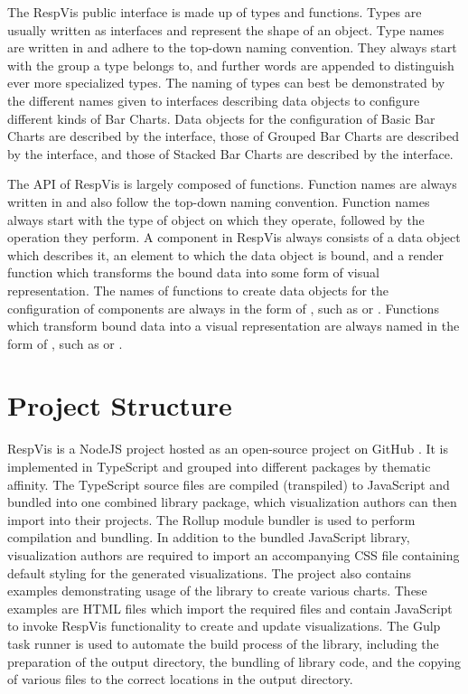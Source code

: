 The RespVis public interface is made up of types and functions. Types
are usually written as interfaces and represent the shape of an
object. Type names are written in 
\parencite{PascalCase} and adhere to the top-down naming
convention. They always start with the group a type belongs to, and
further words are appended to distinguish ever more specialized
types. The naming of types can best be demonstrated by the different
names given to interfaces describing data objects to configure
different kinds of Bar Charts. Data objects for the configuration of
Basic Bar Charts are described by the  interface, those
of Grouped Bar Charts are described by the 
interface, and those of Stacked Bar Charts are described by the
 interface.

The API of RespVis is largely composed of functions. Function names
are always written in  \parencite{camelCase} and also
follow the top-down naming convention. Function names always start
with the type of object on which they operate, followed by the
operation they perform. A component in RespVis always consists of a
data object which describes it, an element to which the data object is
bound, and a render function which transforms the bound data into some
form of visual representation. The names of functions to create data
objects for the configuration of components are always in the form of
, such as  or
. Functions which transform bound data into
a visual representation are always named in the form of
, such as  or
.






\section{Project Structure}
\label{sec:ProjectSetup}

RespVis is a NodeJS \parencite{NodeJS} project hosted as an
open-source project on GitHub \parencite{RespVisGitHub}. It is
implemented in TypeScript and grouped into different packages by
thematic affinity. The TypeScript source files are compiled
(transpiled) to JavaScript and bundled into one combined library
package, which visualization authors can then import into their
projects.
%
The Rollup module bundler \parencite{Rollup} is used to perform
compilation and bundling. In addition to the bundled JavaScript
library, visualization authors are required to import an accompanying
CSS file containing default styling for the generated visualizations.
The project also contains examples demonstrating usage of the library
to create various charts. These examples are HTML files which import
the required files and contain JavaScript to invoke RespVis
functionality to create and update visualizations.
%
The Gulp \parencite{Gulp} task runner is used to automate the build
process of the library, including the preparation of the output
directory, the bundling of library code, and the copying of various
files to the correct locations in the output directory.




